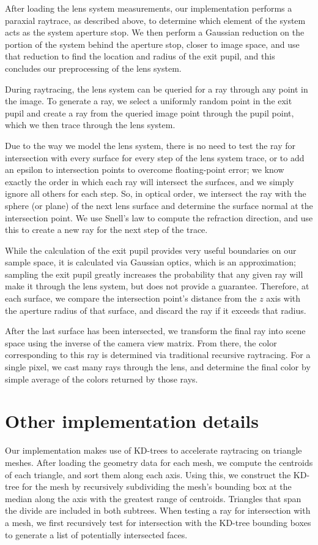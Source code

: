 \documentclass[twocolumn]{article}
\begin{document}
After loading the lens system measurements, our implementation performs a
paraxial raytrace, as described above, to determine which element of the system
acts as the system aperture stop. We then perform a Gaussian reduction on the
portion of the system behind the aperture stop, closer to image space, and use
that reduction to find the location and radius of the exit pupil, and this
concludes our preprocessing of the lens system.

During raytracing, the lens system can be queried for a ray through any point in
the image. To generate a ray, we select a uniformly random point in the exit
pupil and create a ray from the queried image point through the pupil point,
which we then trace through the lens system.

Due to the way we model the lens system, there is no need to test the ray for
intersection with every surface for every step of the lens system trace, or to add
an epsilon to intersection points to overcome floating-point error; we know
exactly the order in which each ray will intersect the surfaces, and we simply
ignore all others for each step. So, in optical order,
we intersect the ray with the sphere (or plane) of the next lens surface and
determine the surface normal at the intersection point. We use Snell's law to
compute the refraction direction, and use this to create a new ray for the next step
of the trace.

While the calculation of the exit pupil provides very useful boundaries on our sample
space, it is calculated via Gaussian optics, which is an approximation;
sampling the exit pupil greatly increases the probability that any given ray will
make it through the lens system, but does not provide a guarantee. Therefore, at
each surface, we compare the intersection point's distance from
the $z$ axis with the aperture radius of that surface, and discard the ray if it
exceeds that radius.

After the last surface has been intersected, we transform the final ray into scene
space using the inverse of the camera view matrix. From there, the color
corresponding to this ray is determined via traditional recursive raytracing.
For a single pixel, we cast many rays through the lens, and determine the final
color by simple average of the colors returned by those rays.

\section{Other implementation details}
Our implementation makes use of KD-trees to accelerate raytracing on triangle
meshes. After loading the geometry data for each mesh, we compute the centroids
of each triangle, and sort them along each axis. Using this, we construct the
KD-tree for the mesh by recursively subdividing the mesh's bounding box at the
median along the axis with the greatest range of centroids.
Triangles that span the divide are included in both subtrees. When testing a ray
for intersection with a mesh, we first recursively test for intersection with
the KD-tree bounding boxes to generate a list of potentially intersected faces.
\end{document}
